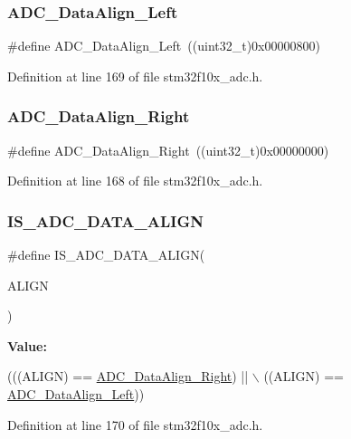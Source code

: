 \subsubsection{\texorpdfstring{A\+D\+C\+\_\+\+Data\+Align\+\_\+\+Left}{ADC\_DataAlign\_Left}}
{\footnotesize\ttfamily \#define A\+D\+C\+\_\+\+Data\+Align\+\_\+\+Left~((uint32\+\_\+t)0x00000800)}



Definition at line 169 of file stm32f10x\+\_\+adc.\+h.

\mbox{\label{group___a_d_c__data__align_ga80b5d2f2b6b058bc498f58e0a92ad035}} 
\subsubsection{\texorpdfstring{A\+D\+C\+\_\+\+Data\+Align\+\_\+\+Right}{ADC\_DataAlign\_Right}}
{\footnotesize\ttfamily \#define A\+D\+C\+\_\+\+Data\+Align\+\_\+\+Right~((uint32\+\_\+t)0x00000000)}



Definition at line 168 of file stm32f10x\+\_\+adc.\+h.

\mbox{\label{group___a_d_c__data__align_ga2903b620e3c61dc47ed8c0fbf4197801}} 
\subsubsection{\texorpdfstring{I\+S\+\_\+\+A\+D\+C\+\_\+\+D\+A\+T\+A\+\_\+\+A\+L\+I\+GN}{IS\_ADC\_DATA\_ALIGN}}
{\footnotesize\ttfamily \#define I\+S\+\_\+\+A\+D\+C\+\_\+\+D\+A\+T\+A\+\_\+\+A\+L\+I\+GN(\begin{DoxyParamCaption}\item[{}]{A\+L\+I\+GN }\end{DoxyParamCaption})}

{\bfseries Value\+:}
\begin{DoxyCode}
(((ALIGN) == \hyperlink{group___a_d_c__data__align_ga80b5d2f2b6b058bc498f58e0a92ad035}{ADC\_DataAlign\_Right}) || \(\backslash\)
                                  ((ALIGN) == \hyperlink{group___a_d_c__data__align_ga87c2b7021bc288174d5d6175dc267251}{ADC\_DataAlign\_Left}))
\end{DoxyCode}


Definition at line 170 of file stm32f10x\+\_\+adc.\+h.

